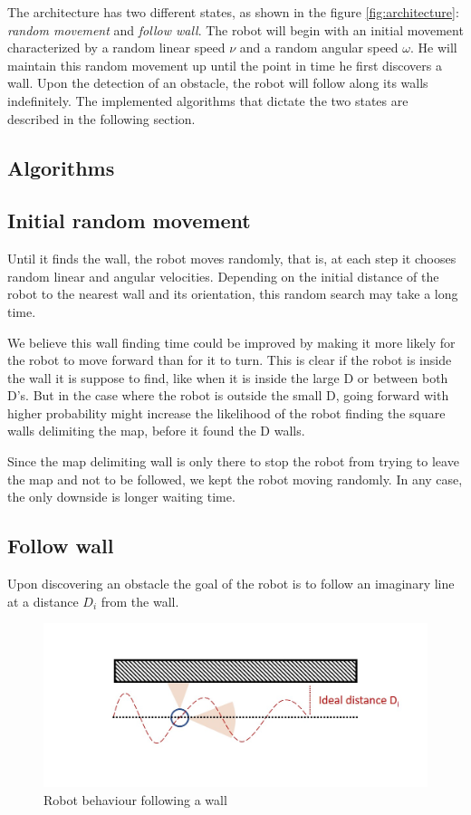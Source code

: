 \documentclass[10pt,journal,compsoc]{IEEEtran}
\begin{document}
The architecture has two different states, as shown in the figure \ref{fig:architecture}: \textit{random movement} and \textit{follow wall}. The robot will begin with an initial movement characterized by a random linear speed $\nu$ and a random angular speed $\omega$. He will maintain this random movement up until the point in time he first discovers a wall. Upon the detection of an obstacle, the robot will follow along its walls indefinitely. The implemented algorithms that dictate the two states are described in the following section. 


\subsection{Algorithms}
\subsection{Initial random movement}

Until it finds the wall, the robot moves randomly, that is, at each step it chooses random linear and angular velocities. Depending on the initial distance of the robot to the nearest wall and its orientation, this random search may take a long time. 

We believe this wall finding time could be improved by making it more likely for the robot to move forward than for it to turn. This is clear if the robot is inside the wall it is suppose to find, like when it is inside the large D or between both D's. But in the case where the robot is outside the small D, going forward with higher probability might increase the likelihood of the robot finding the square walls delimiting the map, before it found the D walls.

Since the map delimiting wall is only there to stop the robot from trying to leave the map and not to be followed, we kept the robot moving randomly. In any case, the only downside is longer waiting time.

\subsection{Follow wall}
Upon discovering an obstacle the goal of the robot is to follow an imaginary line at a distance $D_i$ from the wall. 

   \begin{figure}[thpb]
      \centering
     \includegraphics[scale=0.3]{img/behaviour.jpg}
      \caption{Robot behaviour following a wall}
      \label{fig:wall}
   \end{figure}
\end{document}
